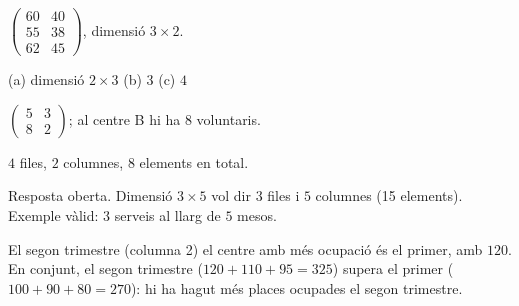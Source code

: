 \begin{solucions}
\begin{sollist}
  \item $\begin{pmatrix} 60 & 40 \\ 55 & 38 \\ 62 & 45 \end{pmatrix}$,
        \;dimensió $3\times 2$.
  \item (a) dimensió $2\times 3$ \quad (b) $3$ \quad (c) $4$
  \item $\begin{pmatrix} 5 & 3 \\ 8 & 2 \end{pmatrix}$;
        \;al centre B hi ha $8$ voluntaris.
  \item $4$ files, $2$ columnes, $8$ elements en total.
  \item Resposta oberta. Dimensió $3\times 5$ vol dir $3$ files i $5$ columnes
        (15 elements). Exemple vàlid: $3$ serveis al llarg de $5$ mesos.
  \item El segon trimestre (columna 2) el centre amb més ocupació és el primer,
        amb $120$. \;En conjunt, el segon trimestre ($120+110+95=325$) supera
        el primer ($100+90+80=270$): hi ha hagut més places ocupades el
        segon trimestre.
\end{sollist}
\end{solucions}
